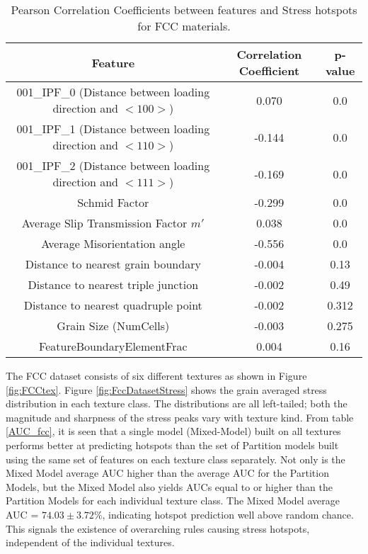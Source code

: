 \documentclass[preprint,1p,times,authoryear]{elsarticle}%
\begin{document}
\begin{table}[!htbp]
\small
\begin{center}
\caption{Pearson Correlation Coefficients between features and Stress hotspots for FCC materials. }
\label{PearsonFCC}
\begin{tabular}{*{3}{c}}
\toprule \textbf{Feature} & \textbf{Correlation Coefficient} & \textbf{p-value}  \\ \midrule
001\_IPF\_0 (Distance between loading direction and $<100>$) &0.070&0.0\\
001\_IPF\_1 (Distance between loading direction and $<110>$)&-0.144&0.0\\
001\_IPF\_2 (Distance between loading direction and $<111>$)&-0.169&0.0\\
\midrule
Schmid Factor & -0.299&0.0\\
Average Slip Transmission Factor $m'$&0.038&0.0\\
Average Misorientation angle & -0.556&0.0\\
\midrule
Distance to nearest grain boundary &-0.004&0.13\\
Distance to nearest triple junction &-0.002&0.49\\
Distance to nearest quadruple point &-0.002&0.312\\
Grain Size (NumCells) & -0.003 & 0.275\\
FeatureBoundaryElementFrac & 0.004 & 0.16\\
\bottomrule
\end{tabular}
\end{center}
\end{table}

The FCC dataset consists of six different textures as shown in Figure \ref{fig:FCCtex}. Figure \ref{fig:FccDatasetStress} shows the grain averaged stress distribution in each texture class. The distributions are all left-tailed; both the magnitude and sharpness of the stress peaks vary with texture kind. From table \ref{AUC_fcc}, it is seen that a single model (Mixed-Model) built on all textures performs better at predicting hotspots than the set of Partition models built using the same set of features on each texture class separately. Not only is the Mixed Model average AUC higher than the average AUC for the Partition Models, but the Mixed Model also yields AUCs equal to or higher than the Partition Models for each individual texture class. The Mixed Model average AUC = $74.03 \pm 3.72 \%$, indicating hotspot prediction well above random chance. This signals the existence of overarching rules causing stress hotspots, independent of the individual textures.
 
\end{document}
